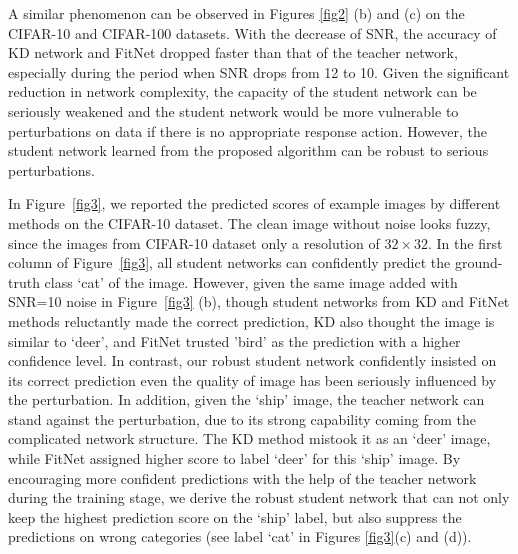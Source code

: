 \documentclass[journal]{IEEEtran}
\newcommand{\Fref}[1]{Figure~\ref{#1}}
\begin{document}
A similar phenomenon can be observed in Figures \ref{fig2} (b) and (c) on the CIFAR-10 and CIFAR-100 datasets. With the decrease of SNR, the accuracy of KD network and FitNet dropped faster than that of the teacher network, especially during the period when SNR drops from 12 to 10. Given the significant reduction in network complexity, the capacity of the student network can be seriously weakened and the student network would be more vulnerable to perturbations on data if there is no appropriate response action. However, the student network learned from the proposed algorithm can be robust to serious perturbations. 

In \Fref{fig3}, we reported the predicted scores of example images by different methods on the CIFAR-10 dataset. The clean image without noise looks fuzzy, since the images from CIFAR-10 dataset only a resolution of $32\times 32$. In the first column of \Fref{fig3}, all student networks can confidently predict the ground-truth class `cat' of the image. However, given the same image added with SNR=10 noise in \Fref{fig3} (b), though student networks from KD and FitNet methods reluctantly made the correct prediction, KD also thought the image is similar to `deer', and FitNet trusted 'bird' as the prediction with a higher confidence level. In contrast, our robust student network confidently insisted on its correct prediction even the quality of image has been seriously influenced by the perturbation. In addition, given the `ship' image, the teacher network can stand against the perturbation, due to its strong capability coming from the complicated network structure. The KD method mistook it as an `deer' image, while FitNet assigned higher score to label `deer' for this `ship' image. By encouraging more confident predictions with the help of the teacher network during the training stage, we derive the robust student network that can not only keep the highest prediction score on the `ship' label, but also suppress the predictions on wrong categories (see label `cat' in Figures \ref{fig3}(c) and (d)).
\end{document}

